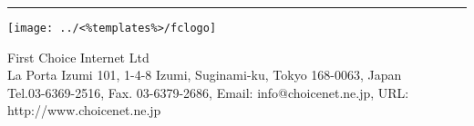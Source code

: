     \rule{\textwidth}{0.5pt}

\parbox[t]{.10\textwidth}{
\vspace{-0.1cm}
   \texttt{[image: ../<\%templates\%>/fclogo]}
}
\parbox[t]{.80\textwidth}{
\vspace{0.2cm}
        {\Large  First Choice Internet Ltd \\
         \normalsize La Porta Izumi 101, 1-4-8 Izumi, Suginami-ku, Tokyo 168-0063, Japan \\
         \small Tel.03-6369-2516,  Fax. 03-6379-2686, Email: info@choicenet.ne.jp, URL: http://www.choicenet.ne.jp \\
         }
}
